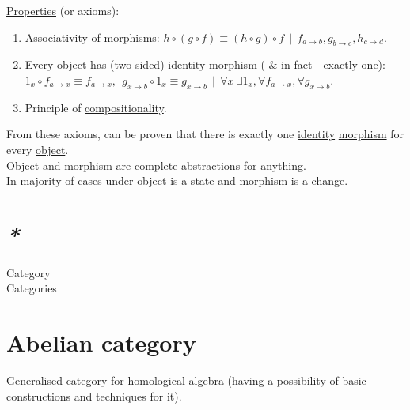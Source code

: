 \documentclass[a4paper,14pt,oneside]{book}
\begin{document}
\hyperref[orge0a1a8a]{Properties} (or axioms):\\
\begin{enumerate}
\item \hyperref[orga16966e]{Associativity} of \hyperref[orgb352465]{morphisms}: \({h} \circ ({g} \circ {f}) \equiv ({h} \circ {g}) \circ {f} \ \ | \ \ {f}_{a \to b}, {g}_{b \to c}, {h}_{c \to d}\).\\
\item Every \hyperref[org65d2cb0]{object} has (two-sided) \hyperref[org5e19243]{identity} \hyperref[orgc908564]{morphism} ( \& in fact - exactly one): \({1}_x \circ {f}_{a \to x} \equiv {f}_{a \to x}, \ \ {g}_{x \to b} \circ {1_x} \equiv {g}_{x \to b } \ \ | \ \ \forall x \ \exists {1}_{x}, \forall {f}_{a \to x},  \forall {g}_{x \to b}\).\\
\item Principle of \hyperref[org94c8125]{compositionality}.\\
\end{enumerate}

From these axioms, can be proven that there is exactly one \hyperref[org5e19243]{identity} \hyperref[orgc908564]{morphism} for every \hyperref[org65d2cb0]{object}.\\

\hyperref[org65d2cb0]{Object} and \hyperref[orgc908564]{morphism} are complete \hyperref[org374d234]{abstractions} for anything.\\
In majority of cases under \hyperref[org65d2cb0]{object} is a state and \hyperref[orgc908564]{morphism} is a change.\\

\section{\emph{*}}
\label{sec:orgcdb4fdf}

\label{org3a5c6d7}Category\\
\label{orgc08c4ac}Categories\\

\section{\label{orge656738}Abelian category}
\label{sec:orgfb2e5ca}
Generalised \hyperref[org3a5c6d7]{category} for homological \hyperref[orgf52fcf3]{algebra} (having a possibility of basic constructions and techniques for it).\\
\end{document}
